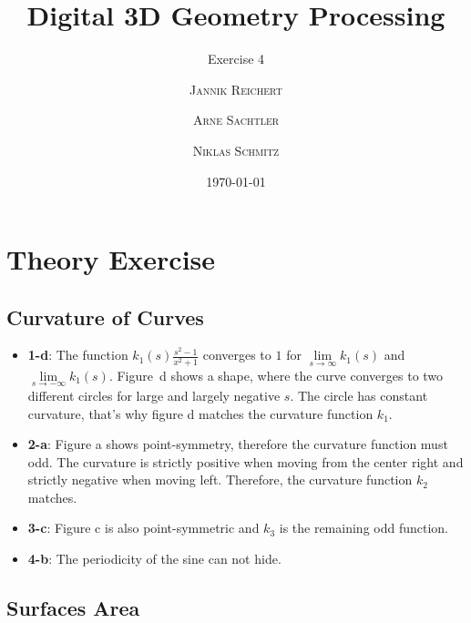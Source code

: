\documentclass{scrartcl}
\title{Digital 3D Geometry Processing}
\subtitle{Exercise 4}
\author{\textsc{Jannik Reichert} \and \textsc{Arne Sachtler} \and \textsc{Niklas Schmitz}}
\date{\today}
\begin{document}
\maketitle

\section{Theory Exercise}

\subsection{Curvature of Curves}

\begin{itemize}
	\item \textbf{1-d}: The function $k_1(s) \frac{s^2 -1}{x^2+1}$ converges to $1$ for $\lim\limits_{s \rightarrow \infty} k_1(s)$ and $\lim\limits_{s \rightarrow -\infty} k_1(s)$. Figure~d shows a shape, where the curve converges to two different circles for large and largely negative $s$. The circle has constant curvature, that's why figure d matches the curvature function $k_1$.
	\item \textbf{2-a}: Figure a shows point-symmetry, therefore the curvature function must odd. The curvature is strictly positive when moving from the center right and strictly negative when moving left. Therefore, the curvature function $k_2$ matches.
	\item \textbf{3-c}: Figure c is also point-symmetric and $k_3$ is the remaining odd function.
	\item \textbf{4-b}: The periodicity of the sine can not hide.
\end{itemize}

\subsection{Surfaces Area}
\end{document}
